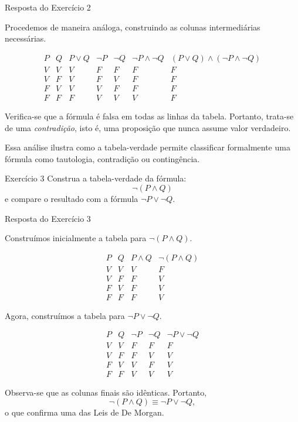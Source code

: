 \documentclass[12pt,a4paper,openright]{book}
\begin{document}
\begin{block}{Resposta do Exercício 2}

Procedemos de maneira análoga, construindo as colunas intermediárias necessárias.

\[
\begin{array}{c|c|c|c|c|c|c}
P & Q & P \lor Q & \neg P & \neg Q & \neg P \land \neg Q & (P \lor Q) \land (\neg P \land \neg Q) \\ \hline
V & V & V & F & F & F & F \\
V & F & V & F & V & F & F \\
F & V & V & V & F & F & F \\
F & F & F & V & V & V & F
\end{array}
\]

Verifica-se que a fórmula é falsa em todas as linhas da tabela. Portanto, trata-se de uma \emph{contradição}, isto é, uma proposição que nunca assume valor verdadeiro.

Essa análise ilustra como a tabela-verdade permite classificar formalmente uma fórmula como tautologia, contradição ou contingência.
\end{block}

\begin{block}{Exercício 3}
Construa a tabela-verdade da fórmula:
\[
\neg(P \land Q)
\]
e compare o resultado com a fórmula \(\neg P \lor \neg Q\).
\end{block}

\begin{block}{Resposta do Exercício 3}

Construímos inicialmente a tabela para \(\neg(P \land Q)\).

\[
\begin{array}{c|c|c|c}
P & Q & P \land Q & \neg(P \land Q) \\ \hline
V & V & V & F \\
V & F & F & V \\
F & V & F & V \\
F & F & F & V
\end{array}
\]

Agora, construímos a tabela para \(\neg P \lor \neg Q\).

\[
\begin{array}{c|c|c|c|c}
P & Q & \neg P & \neg Q & \neg P \lor \neg Q \\ \hline
V & V & F & F & F \\
V & F & F & V & V \\
F & V & V & F & V \\
F & F & V & V & V
\end{array}
\]

Observa-se que as colunas finais são idênticas. Portanto,
\[
\neg(P \land Q) \equiv \neg P \lor \neg Q,
\]
o que confirma uma das Leis de De Morgan.
\end{block}
\end{document}
